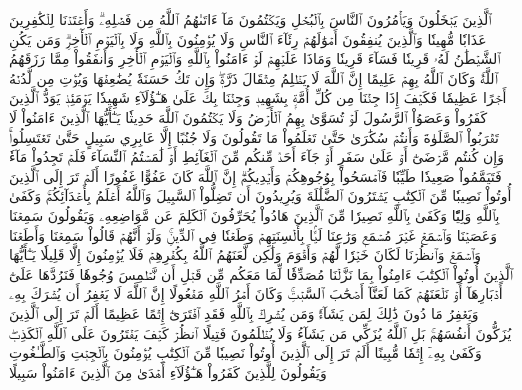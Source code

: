 ٱلَّذِينَ يَبۡخَلُونَ وَيَأۡمُرُونَ ٱلنَّاسَ بِٱلۡبُخۡلِ وَيَكۡتُمُونَ مَآ ءَاتَىٰهُمُ ٱللَّهُ مِن فَضۡلِهِۦۗ وَأَعۡتَدۡنَا لِلۡكَٰفِرِينَ عَذَابٗا مُّهِينٗا
وَٱلَّذِينَ يُنفِقُونَ أَمۡوَٰلَهُمۡ رِئَآءَ ٱلنَّاسِ وَلَا يُؤۡمِنُونَ بِٱللَّهِ وَلَا بِٱلۡيَوۡمِ ٱلۡأٓخِرِۗ وَمَن يَكُنِ ٱلشَّيۡطَٰنُ لَهُۥ قَرِينٗا فَسَآءَ قَرِينٗا
وَمَاذَا عَلَيۡهِمۡ لَوۡ ءَامَنُواْ بِٱللَّهِ وَٱلۡيَوۡمِ ٱلۡأٓخِرِ وَأَنفَقُواْ مِمَّا رَزَقَهُمُ ٱللَّهُۚ وَكَانَ ٱللَّهُ بِهِمۡ عَلِيمًا
إِنَّ ٱللَّهَ لَا يَظۡلِمُ مِثۡقَالَ ذَرَّةٖۖ وَإِن تَكُ حَسَنَةٗ يُضَٰعِفۡهَا وَيُؤۡتِ مِن لَّدُنۡهُ أَجۡرًا عَظِيمٗا
فَكَيۡفَ إِذَا جِئۡنَا مِن كُلِّ أُمَّةِۭ بِشَهِيدٖ وَجِئۡنَا بِكَ عَلَىٰ هَـٰٓؤُلَآءِ شَهِيدٗا
يَوۡمَئِذٖ يَوَدُّ ٱلَّذِينَ كَفَرُواْ وَعَصَوُاْ ٱلرَّسُولَ لَوۡ تُسَوَّىٰ بِهِمُ ٱلۡأَرۡضُ وَلَا يَكۡتُمُونَ ٱللَّهَ حَدِيثٗا
يَـٰٓأَيُّهَا ٱلَّذِينَ ءَامَنُواْ لَا تَقۡرَبُواْ ٱلصَّلَوٰةَ وَأَنتُمۡ سُكَٰرَىٰ حَتَّىٰ تَعۡلَمُواْ مَا تَقُولُونَ وَلَا جُنُبًا إِلَّا عَابِرِي سَبِيلٍ حَتَّىٰ تَغۡتَسِلُواْۚ وَإِن كُنتُم مَّرۡضَىٰٓ أَوۡ عَلَىٰ سَفَرٍ أَوۡ جَآءَ أَحَدٞ مِّنكُم مِّنَ ٱلۡغَآئِطِ أَوۡ لَٰمَسۡتُمُ ٱلنِّسَآءَ فَلَمۡ تَجِدُواْ مَآءٗ فَتَيَمَّمُواْ صَعِيدٗا طَيِّبٗا فَٱمۡسَحُواْ بِوُجُوهِكُمۡ وَأَيۡدِيكُمۡۗ إِنَّ ٱللَّهَ كَانَ عَفُوًّا غَفُورًا
أَلَمۡ تَرَ إِلَى ٱلَّذِينَ أُوتُواْ نَصِيبٗا مِّنَ ٱلۡكِتَٰبِ يَشۡتَرُونَ ٱلضَّلَٰلَةَ وَيُرِيدُونَ أَن تَضِلُّواْ ٱلسَّبِيلَ
وَٱللَّهُ أَعۡلَمُ بِأَعۡدَآئِكُمۡۚ وَكَفَىٰ بِٱللَّهِ وَلِيّٗا وَكَفَىٰ بِٱللَّهِ نَصِيرٗا
مِّنَ ٱلَّذِينَ هَادُواْ يُحَرِّفُونَ ٱلۡكَلِمَ عَن مَّوَاضِعِهِۦ وَيَقُولُونَ سَمِعۡنَا وَعَصَيۡنَا وَٱسۡمَعۡ غَيۡرَ مُسۡمَعٖ وَرَٰعِنَا لَيَّۢا بِأَلۡسِنَتِهِمۡ وَطَعۡنٗا فِي ٱلدِّينِۚ وَلَوۡ أَنَّهُمۡ قَالُواْ سَمِعۡنَا وَأَطَعۡنَا وَٱسۡمَعۡ وَٱنظُرۡنَا لَكَانَ خَيۡرٗا لَّهُمۡ وَأَقۡوَمَ وَلَٰكِن لَّعَنَهُمُ ٱللَّهُ بِكُفۡرِهِمۡ فَلَا يُؤۡمِنُونَ إِلَّا قَلِيلٗا
يَـٰٓأَيُّهَا ٱلَّذِينَ أُوتُواْ ٱلۡكِتَٰبَ ءَامِنُواْ بِمَا نَزَّلۡنَا مُصَدِّقٗا لِّمَا مَعَكُم مِّن قَبۡلِ أَن نَّطۡمِسَ وُجُوهٗا فَنَرُدَّهَا عَلَىٰٓ أَدۡبَارِهَآ أَوۡ نَلۡعَنَهُمۡ كَمَا لَعَنَّآ أَصۡحَٰبَ ٱلسَّبۡتِۚ وَكَانَ أَمۡرُ ٱللَّهِ مَفۡعُولًا
إِنَّ ٱللَّهَ لَا يَغۡفِرُ أَن يُشۡرَكَ بِهِۦ وَيَغۡفِرُ مَا دُونَ ذَٰلِكَ لِمَن يَشَآءُۚ وَمَن يُشۡرِكۡ بِٱللَّهِ فَقَدِ ٱفۡتَرَىٰٓ إِثۡمًا عَظِيمًا
أَلَمۡ تَرَ إِلَى ٱلَّذِينَ يُزَكُّونَ أَنفُسَهُمۚ بَلِ ٱللَّهُ يُزَكِّي مَن يَشَآءُ وَلَا يُظۡلَمُونَ فَتِيلًا
ٱنظُرۡ كَيۡفَ يَفۡتَرُونَ عَلَى ٱللَّهِ ٱلۡكَذِبَۖ وَكَفَىٰ بِهِۦٓ إِثۡمٗا مُّبِينًا
أَلَمۡ تَرَ إِلَى ٱلَّذِينَ أُوتُواْ نَصِيبٗا مِّنَ ٱلۡكِتَٰبِ يُؤۡمِنُونَ بِٱلۡجِبۡتِ وَٱلطَّـٰغُوتِ وَيَقُولُونَ لِلَّذِينَ كَفَرُواْ هَـٰٓؤُلَآءِ أَهۡدَىٰ مِنَ ٱلَّذِينَ ءَامَنُواْ سَبِيلًا
